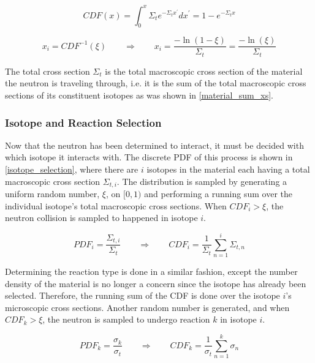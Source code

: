 \begin{equation}
\label{first_col}
CDF(x) = \int_0^x \Sigma_t e^{- \Sigma_t  x^\prime} dx^\prime = 1- e^{- \Sigma_t  x} 
\end{equation}

\begin{equation}
\label{first_col_samp}
x_i=CDF^{-1}(\xi) \qquad \Rightarrow \qquad x_i=\frac{-\ln(1-\xi) }{\Sigma_t}=\frac{-\ln(\xi) }{\Sigma_t}
\end{equation}

The total cross section $\Sigma_t$ is the total macroscopic cross section of the material the neutron is traveling through, i.e. it is the sum of the total macroscopic cross sections of its constituent isotopes as was shown in \eqref{material_sum_xs}.

\subsubsection{Isotope and Reaction Selection}

Now that the neutron has been determined to interact, it must be decided with which isotope it interacts with.  The discrete PDF of this process is shown in \eqref{isotope_selection}, where there are $i$ isotopes in the material each having a total macroscopic cross section $\Sigma_{t,i}$.  The distribution is sampled by generating a uniform random number, $\xi$, on $[0,1)$ and performing a running sum over the individual isotope's total macroscopic cross sections.  When $CDF_i > \xi$, the neutron collision is sampled to happened in isotope $i$.

\begin{equation}
\label{isotope_selection}
PDF_i = \frac{\Sigma_{t,i}}{\Sigma_t} \qquad \Rightarrow \qquad CDF_i = \frac{1}{\Sigma_t } \sum_{n=1}^i \Sigma_{t,n}
\end{equation}

Determining the reaction type is done in a similar fashion, except the number density of the material is no longer a concern since the isotope has already been selected.  Therefore, the running sum of the CDF is done over the isotope $i$'s microscopic cross sections.  Another random number is generated, and when $CDF_k > \xi$, the neutron is sampled to undergo reaction $k$ in isotope $i$.

\begin{equation}
\label{reaction_selection}
PDF_k = \frac{\sigma_k}{\sigma_t} \qquad \Rightarrow \qquad CDF_k = \frac{1}{\sigma_{t} } \sum_{n=1}^k \sigma_{n}
\end{equation}

